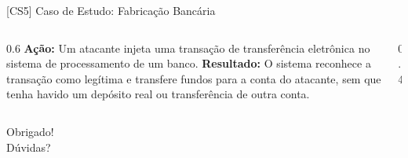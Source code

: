 \documentclass[aspectratio=169]{beamer}
\begin{document}
\begin{frame}{[CS5] Caso de Estudo: Fabricação Bancária}
    \begin{columns}
        \begin{column}{0.6\textwidth}
            \textbf{Ação:} Um atacante injeta uma transação de transferência eletrônica no sistema de processamento de um banco.
            \vspace{0.3cm}
            \textbf{Resultado:} O sistema reconhece a transação como legítima e transfere fundos para a conta do atacante, sem que tenha havido um depósito real ou transferência de outra conta.
        \end{column}
        \begin{column}{0.4\textwidth}
            \centering
        \end{column}
    \end{columns}
\end{frame}

\begin{frame}
  \centering
  \Huge Obrigado!\\
  \vspace{1cm}
  \large Dúvidas?
\end{frame}

\end{document}
